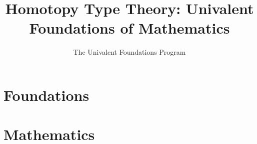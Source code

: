 \documentclass[\OPTfontsize]{book}
\begin{document}
\title{Homotopy Type Theory: Univalent Foundations of Mathematics}
\author{The Univalent Foundations Program}


\frontmatter %

\pagestyle{empty}


\cleartooddpage

\hypertarget{preface}{}

\pagestyle{fancyplain}



\cleartooddpage[\thispagestyle{empty}]

\hypertarget{toc}{}

\setcounter{tocdepth}{1}        %
\tableofcontents
\setcounter{tocdepth}{2}        %
\cleartooddpage[\thispagestyle{empty}]

\mainmatter %

\pagestyle{fancyplain}



\part{Foundations}
\label{part:foundations}















\cleartooddpage[\thispagestyle{empty}] %
\part{Mathematics}
\label{part:mathematics}
\end{document}
